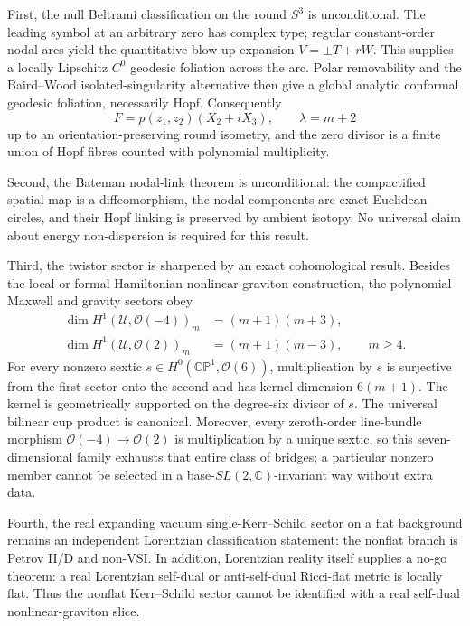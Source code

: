 \documentclass[aps,prd,reprint,nofootinbib,superscriptaddress]{revtex4-2}
\theoremstyle{definition}
\theoremstyle{remark}
\newcommand{\C}{\mathbb{C}}
\newcommand{\CP}{\mathbb{CP}}
\newcommand{\cO}{\mathcal{O}}
\newcommand{\cU}{\mathcal{U}}
\begin{document}
First, the null Beltrami classification on the round $S^3$ is unconditional.  The leading symbol at an arbitrary zero has complex type; regular constant-order nodal arcs yield the quantitative blow-up expansion $V=\pm T+rW$.  This supplies a locally Lipschitz $C^0$ geodesic foliation across the arc.  Polar removability and the Baird--Wood isolated-singularity alternative then give a global analytic conformal geodesic foliation, necessarily Hopf.  Consequently
\begin{equation}
F=p(z_1,z_2)(X_2+iX_3),\qquad \lambda=m+2
\end{equation}
up to an orientation-preserving round isometry, and the zero divisor is a finite union of Hopf fibres counted with polynomial multiplicity.

Second, the Bateman nodal-link theorem is unconditional: the compactified spatial map is a diffeomorphism, the nodal components are exact Euclidean circles, and their Hopf linking is preserved by ambient isotopy.  No universal claim about energy non-dispersion is required for this result.

Third, the twistor sector is sharpened by an exact cohomological result.  Besides the local or formal Hamiltonian nonlinear-graviton construction, the polynomial Maxwell and gravity sectors obey
\begin{align}
\dim H^1(\cU,\cO(-4))_m&=(m+1)(m+3),\nonumber\\
\dim H^1(\cU,\cO(2))_m&=(m+1)(m-3),\qquad m\ge4.
\end{align}
For every nonzero sextic $s\in H^0(\CP^1,\cO(6))$, multiplication by $s$ is surjective from the first sector onto the second and has kernel dimension $6(m+1)$.  The kernel is geometrically supported on the degree-six divisor of $s$.  The universal bilinear cup product is canonical.  Moreover, every zeroth-order line-bundle morphism $\cO(-4)\to\cO(2)$ is multiplication by a unique sextic, so this seven-dimensional family exhausts that entire class of bridges; a particular nonzero member cannot be selected in a base-$SL(2,\C)$-invariant way without extra data.

Fourth, the real expanding vacuum single-Kerr--Schild sector on a flat background remains an independent Lorentzian classification statement: the nonflat branch is Petrov II/D and non-VSI.  In addition, Lorentzian reality itself supplies a no-go theorem: a real Lorentzian self-dual or anti-self-dual Ricci-flat metric is locally flat.  Thus the nonflat Kerr--Schild sector cannot be identified with a real self-dual nonlinear-graviton slice.
\end{document}
